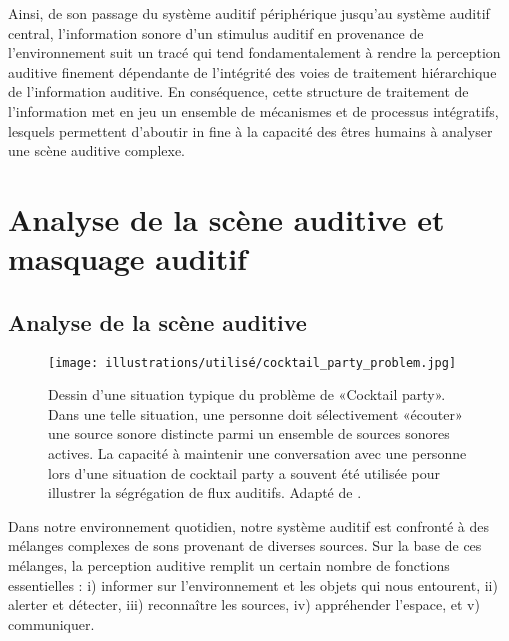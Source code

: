 Ainsi, de son passage du système auditif périphérique jusqu'au système auditif central, l'information sonore d'un stimulus auditif en provenance de l'environnement suit un tracé qui tend fondamentalement à rendre la perception auditive finement dépendante de l'intégrité des voies de traitement hiérarchique de l'information auditive. 
En conséquence, cette structure de traitement de l'information met en jeu un ensemble de mécanismes et de processus intégratifs, lesquels permettent d'aboutir in fine à la capacité des êtres humains à analyser une scène auditive complexe. 

\section{Analyse de la scène auditive et masquage auditif}
\label{analysesceneauditiveetmasquage}

\subsection{Analyse de la scène auditive}
\label{analysesceneauditive}

\begin{figure*}[!t]
\center
\texttt{[image: illustrations/utilisé/cocktail\_party\_problem.jpg]}
\caption[Situation de Cocktail Party]{Dessin d'une situation typique du problème de «Cocktail party». Dans une telle situation, une personne doit sélectivement «écouter» une source sonore distincte parmi un ensemble de sources sonores actives. La capacité à maintenir une conversation avec une personne lors d'une situation de cocktail party a souvent été utilisée pour illustrer la ségrégation de flux auditifs. Adapté de \cite{alain2000selectively}.}
\label{fig:chap2cocktailpartyproblem}
\end{figure*}

Dans notre environnement quotidien, notre système auditif est confronté à des mélanges complexes de sons provenant de diverses sources. 
Sur la base de ces mélanges, la perception auditive remplit un certain nombre de fonctions essentielles : i) informer sur l’environnement et les objets qui nous entourent, ii) alerter et détecter, iii) reconnaître les sources, iv) appréhender l'espace, et v) communiquer.

